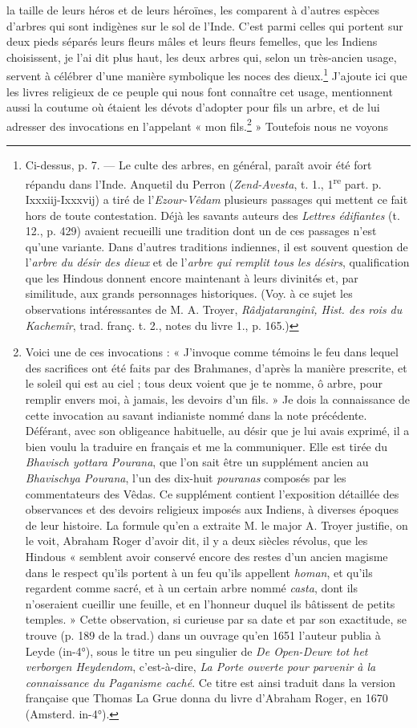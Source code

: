 \documentclass{article}
\begin{document}
la taille de leurs héros et de leurs héroïnes, les comparent à d'autres espèces d'arbres qui sont indigènes sur le sol de l'Inde. C'est parmi celles qui portent sur deux pieds séparés leurs fleurs mâles et leurs fleurs femelles, que les Indiens choisissent, je l'ai dit plus haut, les deux arbres qui, selon un très-ancien usage, servent à célébrer d'une manière symbolique les noces des dieux.\footnote{Ci-dessus, p. 7. --- Le culte des arbres, en général, paraît avoir été fort répandu dans l'Inde. Anquetil du Perron (\emph{Zend-Avesta}, t. 1., 1\textsuperscript{re} part. p. Ixxxiij-Ixxxvij) a tiré de l'\emph{Ezour-Vêdam} plusieurs passages qui mettent ce fait hors de toute contestation. Déjà les savants auteurs des \emph{Lettres édifiantes} (t. 12., p. 429) avaient recueilli une tradition dont un de ces passages n'est qu'une variante. Dans d'autres traditions indiennes, il est souvent question de l'\emph{arbre du désir des dieux} et de l'\emph{arbre qui remplit tous les désirs}, qualification que les Hindous donnent encore maintenant à leurs divinités et, par similitude, aux grands personnages historiques. (Voy. à ce sujet les observations intéressantes de M. A. Troyer, \emph{Râdjataranginî, Hist. des rois du Kachemîr}, trad. franç. t. 2., notes du livre 1., p. 165.)} J'ajoute ici que les livres religieux de ce peuple qui nous font connaître cet usage, mentionnent aussi la coutume où étaient les dévots d'adopter pour fils un arbre, et de lui adresser des invocations en l'appelant « mon fils.\footnote{Voici une de ces invocations : « J'invoque comme témoins le feu dans lequel des sacrifices ont été faits par des Brahmanes, d'après la manière prescrite, et le soleil qui est au ciel ; tous deux voient que je te nomme, ô arbre, pour remplir envers moi, à jamais, les devoirs d'un fils. » Je dois la connaissance de cette invocation au savant indianiste nommé dans la note précédente. Déférant, avec son obligeance habituelle, au désir que je lui avais exprimé, il a bien voulu la traduire en français et me la communiquer. Elle est tirée du \emph{Bhavisch yottara Pourana}, que l'on sait être un supplément ancien au \emph{Bhavischya Pourana}, l'un des dix-huit \emph{pouranas} composés par les commentateurs des Vêdas. Ce supplément contient l'exposition détaillée des observances et des devoirs religieux imposés aux Indiens, à diverses époques de leur histoire. La formule qu'en a extraite M. le major A. Troyer justifie, on le voit, Abraham Roger d'avoir dit, il y a deux siècles révolus, que les Hindous « semblent avoir conservé encore des restes d'un ancien magisme dans le respect qu'ils portent à un feu qu'ils appellent \emph{homan}, et qu'ils regardent comme sacré, et à un certain arbre nommé \emph{casta}, dont ils n'oseraient cueillir une feuille, et en l'honneur duquel ils bâtissent de petits temples. » Cette observation, si curieuse par sa date et par son exactitude, se trouve (p. 189 de la trad.) dans un ouvrage qu'en 1651 l'auteur publia à Leyde (in-4°), sous le titre un peu singulier de \emph{De Open-Deure tot het verborgen Heydendom}, c'est-à-dire, \emph{La Porte ouverte pour parvenir à la connaissance du Paganisme caché}. Ce titre est ainsi traduit dans la version française que Thomas La Grue donna du livre d'Abraham Roger, en 1670 (Amsterd. in-4°).} » Toutefois nous ne voyons 
\end{document}
